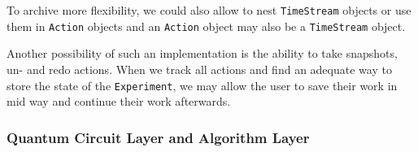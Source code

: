 \documentclass[a4paper,12pt]{article}
\begin{document}
To archive more flexibility, we could also allow to nest \texttt{TimeStream} objects or use them in \texttt{Action} objects and an \texttt{Action} object may also be a \texttt{TimeStream} object.

Another possibility of such an implementation is the ability to take snapshots, un- and redo actions. When we track all actions and find an adequate way to store the state of the \texttt{Experiment}, we may allow the user to save their work in mid way and continue their work afterwards.

\subsubsection{Quantum Circuit Layer and Algorithm Layer}

\end{document}
